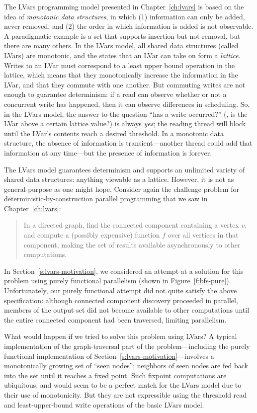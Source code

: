 The LVars programming model presented in Chapter~\ref{ch:lvars} is
based on the idea of \emph{monotonic data structures}, in which (1)
information can only be added, never removed, and (2) the order in
which information is added is not observable.  A paradigmatic example
is a set that supports insertion but not removal, but there are many
others.  In the LVars model, all shared data structures (called LVars)
are monotonic, and the states that an LVar can take on form a
\emph{lattice}.  Writes to an LVar must correspond to a least upper
bound operation in the lattice, which means that they monotonically
increase the information in the LVar, and that they commute with one
another.  But commuting writes are not enough to guarantee
determinism: if a read can observe whether or not a concurrent write
has happened, then it can observe differences in scheduling.  So, in
the LVars model, the answer to the question ``has a write occurred?''
(\ie, is the LVar above a certain lattice value?)  is always
\emph{yes}; the reading thread will block until the LVar's contents
reach a desired threshold.  In a monotonic data structure, the absence
of information is transient---another thread could add that
information at any time---but the presence of information is forever.

The LVars model guarantees determinism and supports an unlimited
variety of shared data structures: anything viewable as a lattice.
However, it is not as general-purpose as one might hope.  Consider
again the challenge problem for deterministic-by-construction parallel
programming that we saw in Chapter~\ref{ch:lvars}:
\begin{quote}
  In a directed graph, find the connected component containing a
  vertex $v$, and compute a (possibly expensive) function $f$ over all
  vertices in that component, making the set of results available
  asynchronously to other computations.
\end{quote}
In Section~\ref{s:lvars-motivation}, we considered an attempt at a
solution for this problem using purely functional parallelism (shown
in Figure~\ref{f:bfs-pure}).  Unfortunately, our purely functional
attempt did not quite satisfy the above specification: although
connected component discovery proceeded in parallel, members of the
output set did not become available to other computations until the
entire connected component had been traversed, limiting parallelism.

What would happen if we tried to solve this problem using LVars?  A
typical implementation of the graph-traversal part of the
problem---including the purely functional implementation of
Section~\ref{s:lvars-motivation}---involves a monotonically growing
set of ``seen nodes''; neighbors of seen nodes are fed back into the
set until it reaches a fixed point.  Such fixpoint computations are
ubiquitous, and would seem to be a perfect match for the LVars model
due to their use of monotonicity.  But they are not expressible using
the threshold read and least-upper-bound write operations of the basic
LVars model.

